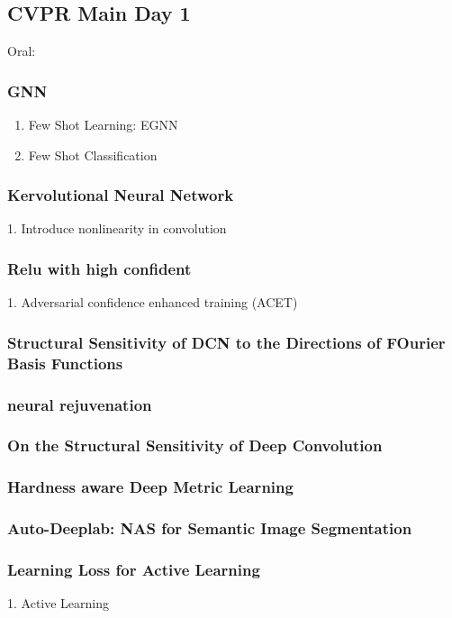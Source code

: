 \subsection{CVPR Main Day 1}
Oral:\\
\subsubsection{GNN}
\begin{enumerate}
    \item Few Shot Learning: EGNN
    \item Few Shot Classification
\end{enumerate}
\subsubsection{Kervolutional Neural Network}
    1. Introduce nonlinearity in convolution\\
\subsubsection{Relu with high confident}
    1. Adversarial confidence enhanced training (ACET)\\
\subsubsection{Structural Sensitivity of DCN to the Directions of FOurier Basis Functions}
\subsubsection{neural rejuvenation}
\subsubsection{On the Structural Sensitivity of Deep Convolution}
\subsubsection{Hardness aware Deep Metric Learning}
\subsubsection{Auto-Deeplab: NAS for Semantic Image Segmentation}
\subsubsection{Learning Loss for Active Learning }
    1. Active Learning \\
